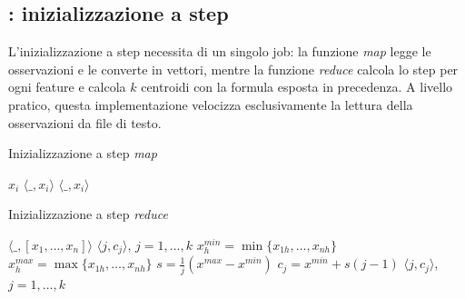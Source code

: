 \documentclass[runningheads]{llncs}
\begin{document}
\subsection*{\mr: inizializzazione a step}
L'inizializzazione a step necessita di un singolo job: la funzione \emph{map} legge le osservazioni e le converte in vettori, mentre la funzione \emph{reduce} calcola lo step per ogni feature e calcola $k$ centroidi con la formula esposta in precedenza. A livello pratico, questa implementazione velocizza esclusivamente la lettura della osservazioni da file di testo.
\begin{minipage}[t]{0.48\textwidth}
\begin{algorithm}[H]
\caption{Inizializzazione a step \textit{map}}
\begin{algorithmic}[1]
    \Require $x_i$
    \Ensure $\langle  \text{\_}, x_i \rangle$
    \State \Return $\langle  \text{\_}, x_i \rangle$
\end{algorithmic}
\end{algorithm}
\end{minipage}%
\hspace{\fill}
\begin{minipage}[t]{0.48\textwidth}
\begin{algorithm}[H]
\caption{Inizializzazione a step \textit{reduce}}
\begin{algorithmic}[1]
    \Require $\langle  \text{\_}, [x_1, \ldots, x_n] \rangle$
    \Ensure $\langle j, c_j \rangle$, $j = 1, \ldots, k$
        \State $x^{min}_h = \min\{{x_{1h}, \ldots, x_{nh}}\}$
        \State $x^{max}_h = \max\{{x_{1h}, \ldots, x_{nh}}\}$
    \EndFor
    \State $s = \frac{1}{j}(x^{max} - x^{min})$
        \State $c_j = x^{min}+ s(j-1)$
    \EndFor
    \State \Return $\langle j, c_j \rangle$, $j = 1, \ldots, k$
\end{algorithmic}
\end{algorithm}
\end{minipage}
\end{document}
